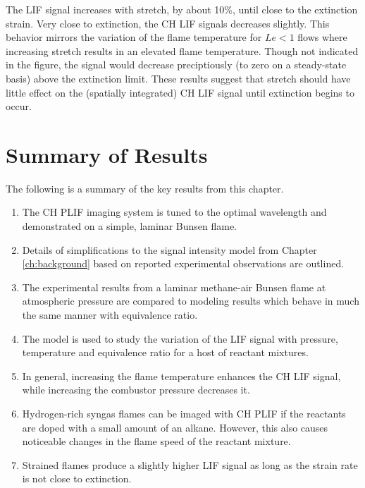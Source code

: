 


The LIF signal increases with stretch, by about 10\%, until close to the extinction strain.
Very close to extinction, the CH LIF signals decreases slightly.
This behavior mirrors the variation of the flame temperature for \(Le<1\) flows where increasing stretch results in an elevated flame temperature.
Though not indicated in the figure, the signal would decrease preciptiously (to zero on a steady-state basis) above the extinction limit.
These results suggest that stretch should have little effect on the (spatially integrated) CH LIF signal until extinction begins to occur.


\section{Summary of Results}

The following is a summary of the key results from this chapter.

\begin{enumerate}
  \item The CH PLIF imaging system is tuned to the optimal wavelength and demonstrated on a simple, laminar Bunsen flame.
  \item Details of simplifications to the signal intensity model from Chapter \ref{ch:background} based on reported experimental observations are outlined.
  \item The experimental results from a laminar methane-air Bunsen flame at atmospheric pressure are compared to modeling results which behave in much the same manner with equivalence ratio.
  \item The model is used to study the variation of the LIF signal with pressure, temperature and equivalence ratio for a host of reactant mixtures.
  \item In general, increasing the flame temperature enhances the CH LIF signal, while increasing the combustor pressure decreases it.
  \item Hydrogen-rich syngas flames can be imaged with CH PLIF if the reactants are doped with a small amount of an alkane.
    However, this also causes noticeable changes in the flame speed of the reactant mixture.
  \item Strained flames produce a slightly higher LIF signal as long as the strain rate is not close to extinction.
\end{enumerate}


